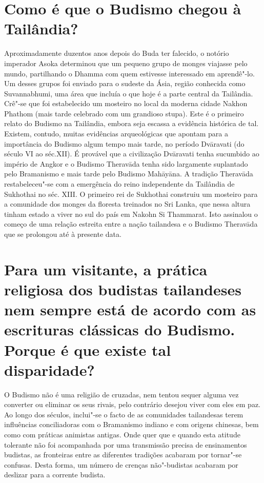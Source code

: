 \section{Como é que o Budismo chegou à Tailândia?}

Aproximadamente duzentos anos depois do Buda ter falecido, o notório
imperador Asoka determinou que um pequeno grupo de monges viajasse pelo
mundo, partilhando o Dhamma com quem estivesse interessado em
aprendê"-lo. Um desses grupos foi enviado para o sudeste da Ásia, região
conhecida como Suvannabhumi, uma área que incluía o que hoje é a parte
central da Tailândia. Crê"-se que foi estabelecido um mosteiro no local
da moderna cidade Nakhon Phathom (mais tarde celebrado com um grandioso
stupa). Este é o primeiro relato do Budismo na Tailândia, embora seja
escassa a evidência histórica de tal. Existem, contudo, muitas
evidências arqueológicas que apontam para a importância do Budismo algum
tempo mais tarde, no período Dvāravati (do século VI ao séc.XII). É
provável que a civilização Dvāravati tenha sucumbido ao império de
Angkor e o Budismo Theravāda tenha sido largamente suplantado pelo
Bramanismo e mais tarde pelo Budismo Mahāyāna. A tradição Theravāda
restabeleceu"-se com a emergência do reino independente da Tailândia de
Sukhothai no séc. XIII. O primeiro rei de Sukhothai construiu um
mosteiro para a comunidade dos monges da floresta treinados no Sri
Lanka, que nessa altura tinham estado a viver no sul do país em Nakohn
Si Thammarat. Isto assinalou o começo de uma relação estreita entre a
nação tailandesa e o Budismo Theravāda que se prolongou até à presente
data.

\section{Para um visitante, a prática religiosa dos budistas tailandeses nem
  sempre está de acordo com as escrituras clássicas do Budismo. Porque é que
  existe tal disparidade?}

O Budismo não é uma religião de cruzadas, nem tentou sequer alguma vez
converter ou eliminar os seus rivais, pelo contrário desejou viver com
eles em paz. Ao longo dos séculos, inclui"-se o facto de as comunidades
tailandesas terem influências conciliadoras com o Bramanismo indiano e
com origens chinesas, bem como com práticas animistas antigas. Onde quer
que e quando esta atitude tolerante não foi acompanhada por uma
transmissão precisa de ensinamentos budistas, as fronteiras entre as
diferentes tradições acabaram por tornar"-se confusas. Desta forma, um
número de crenças não"-budistas acabaram por deslizar para a corrente
budista.

